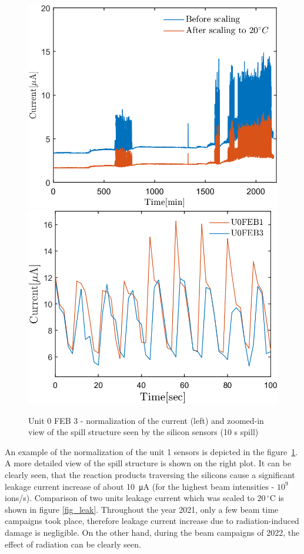 \begin{figure}[!h]
\centering
\includegraphics[width=0.45\columnwidth]{Chapter6/DCS/images/uranium/current_U_highintensity.png}
\includegraphics[width=0.47\columnwidth]{Chapter6/DCS/images/uranium/U3L1_spill.png}
\caption{Unit 0 \gls{FEB} 3 - normalization of the current (left) and zoomed-in view of the spill structure seen by the silicon sensors (10 s spill)}
\label{fig_sensors_spill}
\end{figure}

An example of the normalization of the unit 1 sensors is depicted in the figure~\ref{fig_sensors_spill}. A more detailed view of the spill structure is shown on the right plot. It can be clearly seen, that the reaction products traversing the silicons cause a significant leakage current increase of about \SI{10}{\micro A} (for the highest beam intensities - $10^{9}$ ions/s). Comparison of two units leakage current which was scaled to $20\,^{\circ}$C is shown in figure \ref{fig_leak}. Throughout the year 2021, only a few beam time campaigns took place, therefore leakage current increase due to radiation-induced damage is negligible. On the other hand, during the beam campaigns of 2022, the effect of radiation can be clearly seen.

